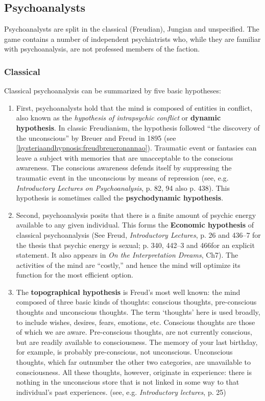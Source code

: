 \begin{refsection}
\subsection{Psychoanalysts}
\label{psychoanalysts}

Psychoanalysts are split in the classical (Freudian), Jungian and unspecified. The game contains a number of independent psychiatrists who, while they are familiar with psychoanalysis, are not professed members of the faction.

\subsubsection{Classical}
\label{classical}

Classical psychoanalysis can be summarized by five basic hypotheses:

\begin{enumerate}
\item First, psychoanalysts hold that the mind is composed of entities in conflict, also known as the \emph{hypothesis of intrapsychic conflict} or \textbf{dynamic hypothesis}. In classic Freudianism, the hypothesis followed ``the discovery of the unconscious'' by Breuer and Freud in 1895 (see \ref{hysteriaandhypnosis:freudbreueronannao}). Traumatic event or fantasies can leave a subject with memories that are unacceptable to the conscious awareness. The conscious awareness defends itself by suppressing the traumatic event in the unconscious by means of repression (see, e.g. \emph{Introductory Lectures on Psychoanalysis}, p. 82, 94 also p. 438). This hypothesis is sometimes called the \textbf{psychodynamic hypothesis}.

\item Second, psychoanalysis posits that there is a finite amount of psychic energy available to any given individual. This forms the \textbf{Economic hypothesis} of classical psychoanalysis (See Freud, \emph{Introductory Lectures}, p. 26 and 436--7 for the thesis that psychic energy is sexual; p. 340, 442--3 and 466for an explicit statement. It also appears in \emph{On the Interpretation Dreams}, Ch7). The activities of the mind are ``costly,'' and hence the mind will optimize its function for the most efficient option.

\item The \textbf{topographical hypothesis} is Freud's most well known: the mind composed of three basic kinds of thoughts: conscious thoughts, pre-conscious thoughts and unconscious thoughts. The term `thoughts' here is used broadly, to include wishes, desires, fears, emotions, etc. Conscious thoughts are those of which we are aware. Pre-conscious thoughts, are not currently conscious, but are readily available to consciousness. The memory of your last birthday, for example, is probably pre-conscious, not unconscious. Unconscious thoughts, which far outnumber the other two categories, are unavailable to consciousness. All these thoughts, however, originate in experience: there is nothing in the unconscious store that is not linked in some way to that individual's past experiences. (see, e.g. \emph{Introductory lectures}, p. 25)


\end{enumerate}
\end{refsection}
